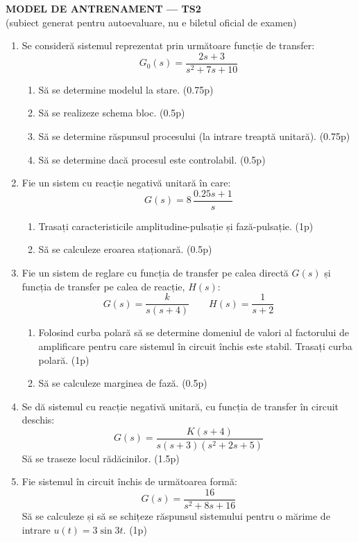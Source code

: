 \documentclass[11pt,a4paper]{article}
\begin{document}
\begin{center}
{\large\bfseries MODEL DE ANTRENAMENT --- TS2}\\[2pt]
{\small (subiect generat pentru autoevaluare, nu e biletul oficial de examen)}
\end{center}
\vspace{0.3cm}

\begin{enumerate}[leftmargin=1.4em]

\item Se consideră sistemul reprezentat prin următoare funcție de transfer:
$$G_0(s)=\frac{2s+3}{s^2+7s+10}$$
\begin{enumerate}[label=\alph*)]
\item Să se determine modelul la stare. (0.75p)
\item Să se realizeze schema bloc. (0.5p)
\item Să se determine răspunsul procesului (la intrare treaptă unitară). (0.75p)
\item Să se determine dacă procesul este controlabil. (0.5p)
\end{enumerate}

\item Fie un sistem cu reacție negativă unitară în care:
$$G(s)=8\,\frac{0.25s+1}{s}$$
\begin{enumerate}[label=\alph*)]
\item Trasați caracteristicile amplitudine-pulsație și fază-pulsație. (1p)
\item Să se calculeze eroarea staționară. (0.5p)
\end{enumerate}

\item Fie un sistem de reglare cu funcția de transfer pe calea directă $G(s)$ și funcția de transfer pe calea de reacție, $H(s)$:
$$G(s)=\frac{k}{s(s+4)}\qquad H(s)=\frac1{s+2}$$
\begin{enumerate}[label=\alph*)]
\item Folosind curba polară să se determine domeniul de valori al factorului de amplificare pentru care sistemul în circuit închis este stabil. Trasați curba polară. (1p)
\item Să se calculeze marginea de fază. (0.5p)
\end{enumerate}

\item Se dă sistemul cu reacție negativă unitară, cu funcția de transfer în circuit deschis:
$$G(s)=\frac{K(s+4)}{s(s+3)(s^2+2s+5)}$$
Să se traseze locul rădăcinilor. (1.5p)

\item Fie sistemul în circuit închis de următoarea formă:
$$G(s)=\frac{16}{s^2+8s+16}$$
Să se calculeze și să se schițeze răspunsul sistemului pentru o mărime de intrare $u(t)=3\sin3t$. (1p)

\end{enumerate}
\end{document}
